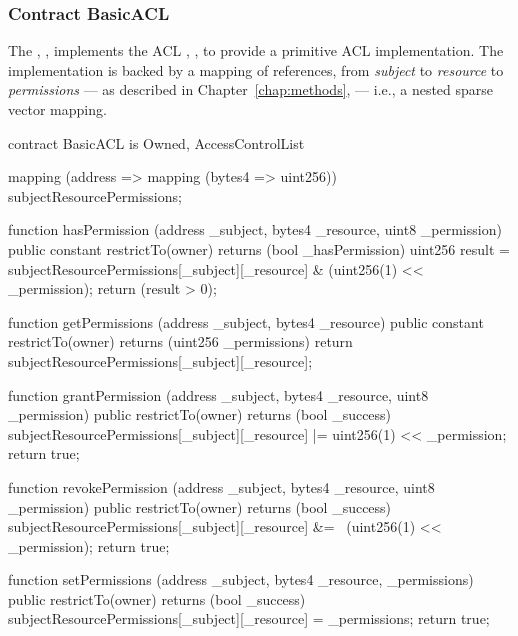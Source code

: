 \subsubsection{Contract BasicACL}

The , , implements the ACL
, , to provide a primitive
ACL implementation. The  implementation is backed by a mapping of
references, from \emph{subject} to \emph{resource} to \emph{permissions} --- as
described in Chapter~\ref{chap:methods}, \emph{} --- i.e.,
a nested sparse vector mapping.

\begin{solidity}
contract BasicACL is Owned, AccessControlList {
  mapping (address => mapping (bytes4 => uint256)) subjectResourcePermissions;

  function hasPermission (address _subject, bytes4 _resource, uint8 _permission) public constant restrictTo(owner) returns (bool _hasPermission) {
    uint256 result = subjectResourcePermissions[_subject][_resource] & (uint256(1) << _permission);
    return (result > 0);
  }

  function getPermissions (address _subject, bytes4 _resource) public constant restrictTo(owner) returns (uint256 _permissions) {
    return subjectResourcePermissions[_subject][_resource];
  }

  function grantPermission (address _subject, bytes4 _resource, uint8 _permission) public restrictTo(owner) returns (bool _success) {
    subjectResourcePermissions[_subject][_resource] |= uint256(1) << _permission;
    return true;
  }

  function revokePermission (address _subject, bytes4 _resource, uint8 _permission) public restrictTo(owner) returns (bool _success) {
    subjectResourcePermissions[_subject][_resource] &= ~(uint256(1) << _permission);
    return true;
  }

  function setPermissions (address _subject, bytes4 _resource, _permissions) public restrictTo(owner) returns (bool _success) {
    subjectResourcePermissions[_subject][_resource] = _permissions;
    return true;
  }
}
\end{solidity}

